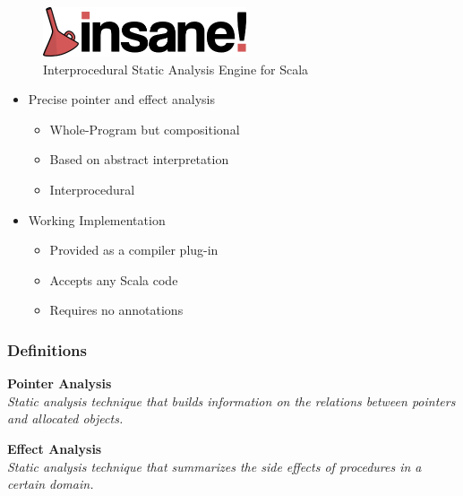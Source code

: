 \documentclass[hyperref={pdfpagelabels=false}]{beamer}
\begin{document}
\begin{frame}[label=overview]
    \begin{figure}[t]
        \includegraphics[width=60mm]{../../logo.png}\\
        Interprocedural Static Analysis Engine for Scala
    \end{figure}

    \begin{itemize}
        \item Precise pointer and effect analysis
            \begin{itemize}
                \item Whole-Program but compositional
                \item Based on abstract interpretation
                \item Interprocedural
            \end{itemize}
        \item Working Implementation
            \begin{itemize}
                \item Provided as a compiler plug-in
                \item Accepts any Scala code
                \item Requires no annotations
            \end{itemize}
    \end{itemize}
\end{frame}

\begin{frame}
\frametitle{Definitions}
    \textbf{Pointer Analysis}\\
    \emph{Static analysis technique that builds information on the
relations between pointers and allocated objects.}

    \vspace{30pt}

    \textbf{Effect Analysis}\\
    \emph{Static analysis technique that summarizes the side effects
of procedures in a certain domain.}
\end{frame}
\end{document}
